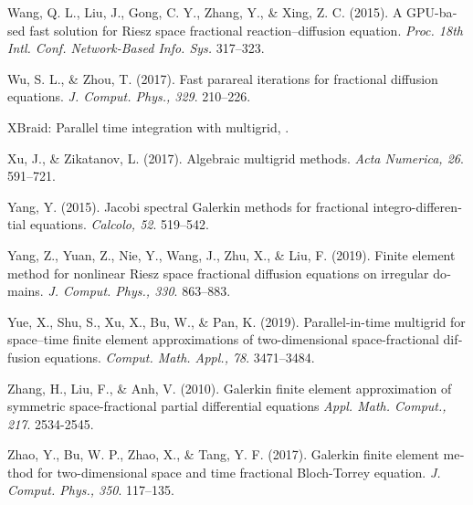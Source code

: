 \begin{latin}
\begin{thebibliography}{99}
Wang, Q. L., Liu, J., Gong, C. Y., Zhang, Y., \& Xing, Z. C.
(2015).
A GPU-based fast solution for Riesz space fractional reaction–diffusion equation.
\textit{Proc. 18th Intl. Conf. Network-Based Info. Sys.}
317–323.

Wu, S. L., \& Zhou, T.
(2017).
Fast parareal iterations for fractional diffusion equations.
\textit{J. Comput. Phys., 329}.
210–226.

XBraid: Parallel time integration with multigrid, 
\href{https://llnl.gov/casc/xbraid}{}.

Xu, J., \& Zikatanov, L.
(2017).
Algebraic multigrid methods.
\textit{Acta Numerica, 26}.
591–721.

Yang, Y.
(2015).
Jacobi spectral Galerkin methods for fractional integro-differential equations.
\textit{Calcolo, 52}.
519–542.

Yang, Z., Yuan, Z., Nie, Y., Wang, J., Zhu, X., \& Liu, F.
(2019).
Finite element method for nonlinear Riesz space fractional diffusion equations on irregular domains.
\textit{J. Comput. Phys., 330}.
863–883.

Yue, X., Shu, S., Xu, X., Bu, W., \& Pan, K.
(2019).
Parallel-in-time multigrid for space–time finite element approximations of two-dimensional space-fractional diffusion equations.
\textit{Comput. Math. Appl., 78}.
3471–3484.

Zhang, H., Liu, F., \& Anh, V.
(2010).
Galerkin finite element approximation of symmetric space-fractional partial differential equations
\textit{Appl. Math. Comput., 217}.
2534-2545.

Zhao, Y., Bu, W. P., Zhao, X., \& Tang, Y. F.
(2017).
Galerkin finite element method for two-dimensional space and time fractional Bloch-Torrey equation.
\textit{J. Comput. Phys., 350}.
117–135.


\end{thebibliography}

\end{latin}

